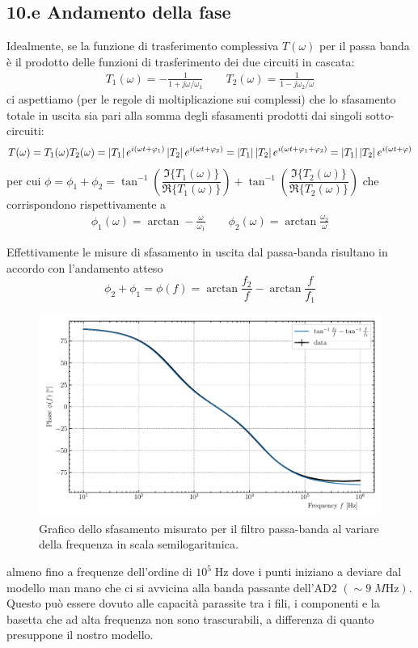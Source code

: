 \documentclass[10pt,a4paper]{article}
\begin{document}
\subsection*{10.e Andamento della fase}
Idealmente, se la funzione di trasferimento complessiva $T(\omega)$ per il
passa banda è il prodotto delle funzioni di trasferimento dei due circuiti in
cascata:
\begin{align*}
T_1(\omega) = -\frac{1}{1 + j \omega/\omega_1} \qquad
T_2(\omega) = \frac{1}{1 - j \omega_2/\omega}
\end{align*}
ci aspettiamo (per le regole di moltiplicazione sui complessi) che lo
sfasamento totale in uscita sia pari alla somma degli sfasamenti prodotti dai
singoli sotto-circuiti:
\[
T(\omega) = T_1(\omega) T_2(\omega) =
\left| T_1 \right| e^{i (\omega t + \varphi_1)} \left| T_2 \right| e^{i (\omega t + \varphi_2)} =
\left| T_1 \right| \left| T_2 \right| e^{i (\omega t + \varphi_1 + \varphi_2)} =
\left| T_1 \right| \left| T_2 \right| e^{i (\omega t + \varphi)}
\]
per cui $\phi = \phi_1 + \phi_2 =
\tan^{-1} \left( \dfrac{\Im{\{T_1(\omega)\}}}{\Re{\{T_1(\omega)\}}} \right) +
\tan^{-1} \left( \dfrac{\Im{\{T_2(\omega)\}}}{\Re{\{T_2(\omega)\}}} \right)$
che corrispondono rispettivamente a
\begin{align*}
\phi_1(\omega) = \arctan - \frac{\omega}{\omega_1} \qquad
\phi_2(\omega) = \arctan \frac{\omega_2}{\omega}
\end{align*}

Effettivamente le misure di sfasamento in uscita dal passa-banda risultano
in accordo con l'andamento atteso
\begin{equation}
\phi_2 + \phi_1 = \phi(f) = \arctan{\frac{f_2}{f}} - \arctan{\frac{f}{f_1}}
\end{equation}
\begin{figure}[htb]
\centering
\includegraphics[scale=0.7]{bpfphase}
\caption{Grafico dello sfasamento misurato per il filtro passa-banda al
variare della frequenza in scala semilogaritmica.}
\end{figure}
almeno fino a frequenze dell'ordine di $10^5 \; \si{\Hz}$ dove i punti
iniziano a deviare dal modello man mano che ci si avvicina alla banda
passante dell'AD2 $(\sim 9 \; \si{M\Hz})$. Questo può essere dovuto alle
capacità parassite tra i fili, i componenti e la basetta che ad alta
frequenza non sono trascurabili, a differenza di quanto presuppone il nostro
modello.
\end{document}
